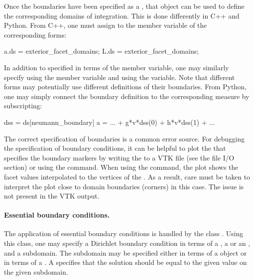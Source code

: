 Once the boundaries have been specified as a , that
object can be used to define the corresponding domains of
integration. This is done differently in C++ and Python. From C++, one
must assign to the  member variable of the corresponding
forms:
\begin{c++}
a.ds = exterior_facet_domains;
L.ds = exterior_facet_domains;
\end{c++}
In addition to  specified in terms of
the  member variable, one may similarly specify
 using the  member variable and
 using the  variable.  Note that
different forms may potentially use different definitions of their
boundaries. From Python, one may simply connect the boundary
definition to the corresponding measure by subscripting:
\begin{python}
dss = ds[neumann_boundary]
a = ... + g*v*dss(0) + h*v*dss(1) + ...
\end{python}

The correct specification of boundaries is a common error source. For
debugging the specification of boundary conditions, it can be helpful
to plot the  that specifies the boundary markers by
writing the  to a VTK file (see the file I/O
section) or using the  command. When using the 
command, the plot shows the facet values interpolated to the vertices
of the . As a result, care must be taken to interpret the
plot close to domain boundaries (corners) in this case. The issue is
not present in the VTK output.

\paragraph{Essential boundary conditions.}

The application of essential boundary conditions is handled by the
class . Using this class, one may specify a Dirichlet
boundary condition in terms of a , a 
or an , and a subdomain. The subdomain may be
specified either in terms of a  object or in terms of a
. A  specifies that the solution
should be equal to the given value on the given subdomain.

